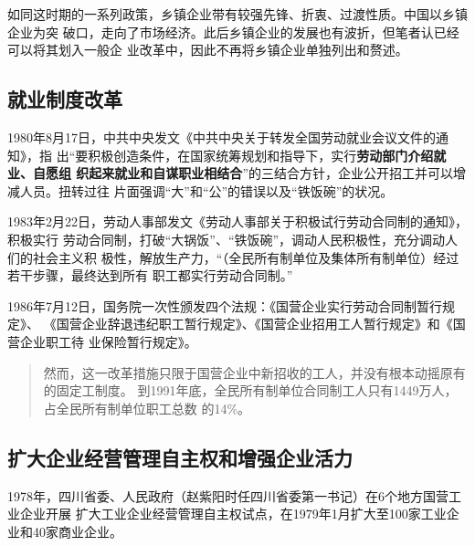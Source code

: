 如同这时期的一系列政策，乡镇企业带有较强先锋、折衷、过渡性质。中国以乡镇企业为突
破口，走向了市场经济。此后乡镇企业的发展也有波折，但笔者认已经可以将其划入一般企
业改革中，因此不再将乡镇企业单独列出和赘述。

\subsection{就业制度改革}

1980年8月17日，中共中央发文《中共中央关于转发全国劳动就业会议文件的通知》，指
出“要积极创造条件，在国家统筹规划和指导下，实行\textbf{劳动部门介绍就业、自愿组
  织起来就业和自谋职业相结合}”的三结合方针，企业公开招工并可以增减人员。扭转过往
片面强调“大”和“公”的错误以及“铁饭碗”的状况。

1983年2月22日，劳动人事部发文《劳动人事部关于积极试行劳动合同制的通知》，积极实行
劳动合同制，打破“大锅饭”、“铁饭碗”，调动人民积极性，充分调动人们的社会主义积
极性，解放生产力，“（全民所有制单位及集体所有制单位）经过若干步骤，最终达到所有
职工都实行劳动合同制。”

1986年7月12日，国务院一次性颁发四个法规：《国营企业实行劳动合同制暂行规定》、
《国营企业辞退违纪职工暂行规定》、《国营企业招用工人暂行规定》和《国营企业职工待
业保险暂行规定》。
\begin{quotation}
  然而，这一改革措施只限于国营企业中新招收的工人，并没有根本动摇原有的固定工制度。
  到1991年底，全民所有制单位合同制工人只有1449万人，占全民所有制单位职工总数
  的14\%。\cite{laodongzhiduyuanfang}
\end{quotation}



\subsection{扩大企业经营管理自主权和增强企业活力}

1978年，四川省委、人民政府（赵紫阳时任四川省委第一书记）在6个地方国营工业企业开展
扩大工业企业经营管理自主权试点，在1979年1月扩大至100家工业企业和40家商业企业。

